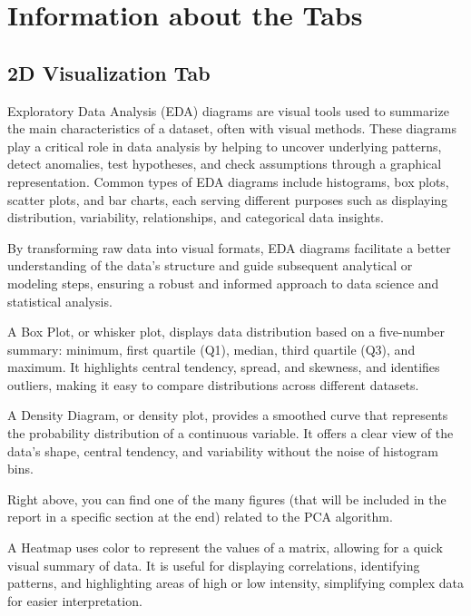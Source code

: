 \documentclass[unnumsec,webpdf,contemporary,large]{oup-authoring-template}%
\theoremstyle{thmstyleone}%
\theoremstyle{thmstyletwo}%
\theoremstyle{thmstylethree}%
\begin{document}
\section{Information about the Tabs}\label{subsec1}
\vspace{0.3cm}

\subsection{\textbf{2D Visualization Tab}}
\vspace{0.2cm}

Exploratory Data Analysis (EDA) diagrams are visual tools used to summarize the main characteristics of a dataset, often with visual methods. These diagrams play a critical role in data analysis by helping to uncover underlying patterns, detect anomalies, test hypotheses, and check assumptions through a graphical representation. Common types of EDA diagrams include histograms, box plots, scatter plots, and bar charts, each serving different purposes such as displaying distribution, variability, relationships, and categorical data insights. 
\vspace{0.2cm}

By transforming raw data into visual formats, EDA diagrams facilitate a better understanding of the data's structure and guide subsequent analytical or modeling steps, ensuring a robust and informed approach to data science and statistical analysis.
\vspace{0.2cm}

A Box Plot, or whisker plot, displays data distribution based on a five-number summary: minimum, first quartile (Q1), median, third quartile (Q3), and maximum. It highlights central tendency, spread, and skewness, and identifies outliers, making it easy to compare distributions across different datasets.
\vspace{0.2cm}

A Density Diagram, or density plot, provides a smoothed curve that represents the probability distribution of a continuous variable. It offers a clear view of the data’s shape, central tendency, and variability without the noise of histogram bins.
\vspace{0.1cm}

Right above, you can find one of the many figures (that will be included in the report in a specific section at the end) related to the PCA algorithm.
\vspace{0.2cm}

A Heatmap uses color to represent the values of a matrix, allowing for a quick visual summary of data. It is useful for displaying correlations, identifying patterns, and highlighting areas of high or low intensity, simplifying complex data for easier interpretation.
\vspace{0.2cm}
\end{document}
